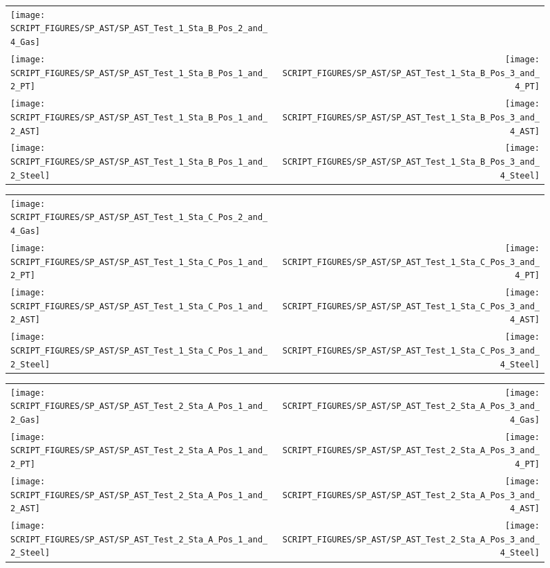 \begin{figure}[p]
\begin{tabular*}{\textwidth}{l@{\extracolsep{\fill}}r}
\texttt{[image: SCRIPT\_FIGURES/SP\_AST/SP\_AST\_Test\_1\_Sta\_B\_Pos\_2\_and\_4\_Gas]} &
  \\
\texttt{[image: SCRIPT\_FIGURES/SP\_AST/SP\_AST\_Test\_1\_Sta\_B\_Pos\_1\_and\_2\_PT]} &
\texttt{[image: SCRIPT\_FIGURES/SP\_AST/SP\_AST\_Test\_1\_Sta\_B\_Pos\_3\_and\_4\_PT]} \\
\texttt{[image: SCRIPT\_FIGURES/SP\_AST/SP\_AST\_Test\_1\_Sta\_B\_Pos\_1\_and\_2\_AST]} &
\texttt{[image: SCRIPT\_FIGURES/SP\_AST/SP\_AST\_Test\_1\_Sta\_B\_Pos\_3\_and\_4\_AST]} \\
\texttt{[image: SCRIPT\_FIGURES/SP\_AST/SP\_AST\_Test\_1\_Sta\_B\_Pos\_1\_and\_2\_Steel]} &
\texttt{[image: SCRIPT\_FIGURES/SP\_AST/SP\_AST\_Test\_1\_Sta\_B\_Pos\_3\_and\_4\_Steel]}
\end{tabular*}
\label{SP_Test_1_Station_B}
\end{figure}

\begin{figure}[p]
\begin{tabular*}{\textwidth}{l@{\extracolsep{\fill}}r}
\texttt{[image: SCRIPT\_FIGURES/SP\_AST/SP\_AST\_Test\_1\_Sta\_C\_Pos\_2\_and\_4\_Gas]} &
  \\
\texttt{[image: SCRIPT\_FIGURES/SP\_AST/SP\_AST\_Test\_1\_Sta\_C\_Pos\_1\_and\_2\_PT]} &
\texttt{[image: SCRIPT\_FIGURES/SP\_AST/SP\_AST\_Test\_1\_Sta\_C\_Pos\_3\_and\_4\_PT]} \\
\texttt{[image: SCRIPT\_FIGURES/SP\_AST/SP\_AST\_Test\_1\_Sta\_C\_Pos\_1\_and\_2\_AST]} &
\texttt{[image: SCRIPT\_FIGURES/SP\_AST/SP\_AST\_Test\_1\_Sta\_C\_Pos\_3\_and\_4\_AST]} \\
\texttt{[image: SCRIPT\_FIGURES/SP\_AST/SP\_AST\_Test\_1\_Sta\_C\_Pos\_1\_and\_2\_Steel]} &
\texttt{[image: SCRIPT\_FIGURES/SP\_AST/SP\_AST\_Test\_1\_Sta\_C\_Pos\_3\_and\_4\_Steel]}
\end{tabular*}
\label{SP_Test_1_Station_C}
\end{figure}


\begin{figure}[p]
\begin{tabular*}{\textwidth}{l@{\extracolsep{\fill}}r}
\texttt{[image: SCRIPT\_FIGURES/SP\_AST/SP\_AST\_Test\_2\_Sta\_A\_Pos\_1\_and\_2\_Gas]} &
\texttt{[image: SCRIPT\_FIGURES/SP\_AST/SP\_AST\_Test\_2\_Sta\_A\_Pos\_3\_and\_4\_Gas]} \\
\texttt{[image: SCRIPT\_FIGURES/SP\_AST/SP\_AST\_Test\_2\_Sta\_A\_Pos\_1\_and\_2\_PT]} &
\texttt{[image: SCRIPT\_FIGURES/SP\_AST/SP\_AST\_Test\_2\_Sta\_A\_Pos\_3\_and\_4\_PT]} \\
\texttt{[image: SCRIPT\_FIGURES/SP\_AST/SP\_AST\_Test\_2\_Sta\_A\_Pos\_1\_and\_2\_AST]} &
\texttt{[image: SCRIPT\_FIGURES/SP\_AST/SP\_AST\_Test\_2\_Sta\_A\_Pos\_3\_and\_4\_AST]} \\
\texttt{[image: SCRIPT\_FIGURES/SP\_AST/SP\_AST\_Test\_2\_Sta\_A\_Pos\_1\_and\_2\_Steel]} &
\texttt{[image: SCRIPT\_FIGURES/SP\_AST/SP\_AST\_Test\_2\_Sta\_A\_Pos\_3\_and\_4\_Steel]}
\end{tabular*}
\label{SP_Test_2_Station_A}
\end{figure}

